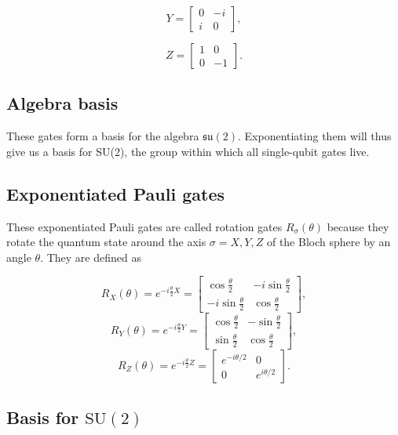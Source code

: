 \documentclass[%
oneside,                 %
final,                   %
10pt]{article}
\begin{document}
\[
Y=\begin{bmatrix}0 & -i \\i & 0\end{bmatrix},
\]

\[
Z=\begin{bmatrix} 1 & 0 \\ 0 & -1\end{bmatrix}.
\]

\subsection{Algebra basis}

These gates form a basis for
the algebra $\mathfrak{su}(2)$. Exponentiating them will thus give us
a basis for SU(2), the group within which all single-qubit gates
live.

\subsection{Exponentiated Pauli gates}

These exponentiated Pauli gates are called rotation gates
$R_{\sigma}(\theta)$ because they rotate the quantum state around the
axis $\sigma=X,Y,Z$ of the Bloch sphere by an angle $\theta$. They are
defined as

\[
R_X(\theta)=e^{-i\frac{\theta}{2}X}=
\begin{bmatrix}
\cos\frac{\theta}{2} & -i\sin\frac{\theta}{2} \\
-i\sin\frac{\theta}{2} & \cos\frac{\theta}{2} 
\end{bmatrix},
\]
\[
R_Y(\theta)=e^{-i\frac{\theta}{2}Y}=
\begin{bmatrix}
\cos\frac{\theta}{2} & -\sin\frac{\theta}{2} \\
\sin\frac{\theta}{2} & \cos\frac{\theta}{2} 
\end{bmatrix},
\]
\[
R_Z(\theta)=e^{-i\frac{\theta}{2}Z}=\begin{bmatrix}
e^{-i\theta/2} & 0 \\
0 & e^{i\theta/2}\end{bmatrix}.
\]

\subsection{Basis for $\mathrm{SU}(2)$}
\end{document}

